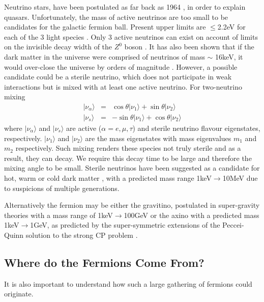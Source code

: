Neutrino stars, have been postulated as far back as 1964 \cite{ref_neutrinostar}, in order to explain
quasars. Unfortunately, the mass of active neutrinos are too small to be candidates for the galactic fermion ball. Present upper
limits are $\le$2.2eV for each of the 3 light species \cite{ref_neutrinomass,ref_neutrinomass2}.
Only 3 active neutrinos can exist on account of
limits on the invisible decay width of the $Z^0$ boson \cite{ref_4neutrinos}.
It has also been shown that if the dark matter in the universe were comprised of
neutrinos of mass $\sim$ 16keV, it would over-close the universe by orders of magnitude \cite{ref_nonneutrino}. However,
a possible candidate could be a sterile neutrino, which does not participate in weak interactions but is mixed with at least one
active neutrino. For two-neutrino mixing
\begin{eqnarray}
	 | \nu_\alpha \rangle &=& \cos{\theta} | \nu_1 \rangle + \sin{\theta} | \nu_2 \rangle \nonumber \\
	 | \nu_s \rangle &=& -\sin{\theta} | \nu_1 \rangle + \cos{\theta} | \nu_2 \rangle
	 \label{eqn_sterileneutrino}
\end{eqnarray}
where $| \nu_\alpha \rangle$ and $| \nu_s \rangle$ are active ($\alpha = e,\mu,\tau$) and sterile neutrino flavour eigenstates, respectively.
$| \nu_1 \rangle$ and $| \nu_2 \rangle$ are the mass eigenstates with mass eigenvalues $m_1$ and $m_2$ respectively.
Such mixing renders these species not truly sterile and as a result, they can decay.
We require this decay time to be large and therefore the mixing angle to be small.
Sterile neutrinos have been suggested as a candidate for hot, warm or cold dark matter \cite{ref_sterileneutrino1, ref_sterileneutrino},
with a predicted mass range 1keV$\rightarrow$10MeV due to suspicions of multiple generations.

Alternatively the fermion may be either the gravitino, postulated in super-gravity theories with a mass range of 1keV$\rightarrow$100GeV
\cite{ref_gravitino} or the axino with a predicted mass 1keV$\rightarrow$1GeV, as predicted by the super-symmetric extensions of the
Peccei-Quinn solution to the strong CP problem \cite{ref_axinomass, ref_axino, ref_axinodark}.

\subsection{Where do the Fermions Come From?}
It is also important to understand how such a large gathering of fermions could originate.

